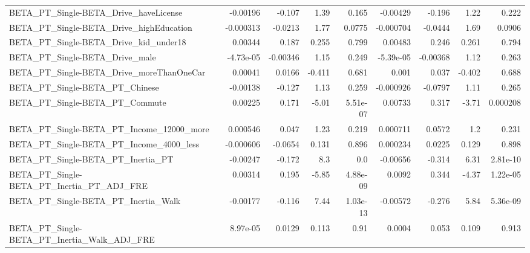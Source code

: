 \begin{tabular}{lrrrrrrrr}
BETA\_PT\_Single-BETA\_Drive\_haveLicense              &    -0.00196 &       -0.107 &     1.39 &    0.165 &   -0.00429 &      -0.196 &         1.22 &         0.222 \\
BETA\_PT\_Single-BETA\_Drive\_highEducation            &   -0.000313 &      -0.0213 &     1.77 &   0.0775 &  -0.000704 &     -0.0444 &         1.69 &        0.0906 \\
BETA\_PT\_Single-BETA\_Drive\_kid\_under18              &     0.00344 &        0.187 &    0.255 &    0.799 &    0.00483 &       0.246 &        0.261 &         0.794 \\
BETA\_PT\_Single-BETA\_Drive\_male                     &   -4.73e-05 &     -0.00346 &     1.15 &    0.249 &  -5.39e-05 &    -0.00368 &         1.12 &         0.263 \\
BETA\_PT\_Single-BETA\_Drive\_moreThanOneCar           &     0.00041 &       0.0166 &   -0.411 &    0.681 &      0.001 &       0.037 &       -0.402 &         0.688 \\
BETA\_PT\_Single-BETA\_PT\_Chinese                     &    -0.00138 &       -0.127 &     1.13 &    0.259 &  -0.000926 &     -0.0797 &         1.11 &         0.265 \\
BETA\_PT\_Single-BETA\_PT\_Commute                     &     0.00225 &        0.171 &    -5.01 & 5.51e-07 &    0.00733 &       0.317 &        -3.71 &      0.000208 \\
BETA\_PT\_Single-BETA\_PT\_Income\_12000\_more           &    0.000546 &        0.047 &     1.23 &    0.219 &   0.000711 &      0.0572 &          1.2 &         0.231 \\
BETA\_PT\_Single-BETA\_PT\_Income\_4000\_less            &   -0.000606 &      -0.0654 &    0.131 &    0.896 &   0.000234 &      0.0225 &        0.129 &         0.898 \\
BETA\_PT\_Single-BETA\_PT\_Inertia\_PT                  &    -0.00247 &       -0.172 &      8.3 &      0.0 &   -0.00656 &      -0.314 &         6.31 &      2.81e-10 \\
BETA\_PT\_Single-BETA\_PT\_Inertia\_PT\_ADJ\_FRE          &     0.00314 &        0.195 &    -5.85 & 4.88e-09 &     0.0092 &       0.344 &        -4.37 &      1.22e-05 \\
BETA\_PT\_Single-BETA\_PT\_Inertia\_Walk                &    -0.00177 &       -0.116 &     7.44 & 1.03e-13 &   -0.00572 &      -0.276 &         5.84 &      5.36e-09 \\
BETA\_PT\_Single-BETA\_PT\_Inertia\_Walk\_ADJ\_FRE        &    8.97e-05 &       0.0129 &    0.113 &     0.91 &     0.0004 &       0.053 &        0.109 &         0.913 \\

\end{tabular}
